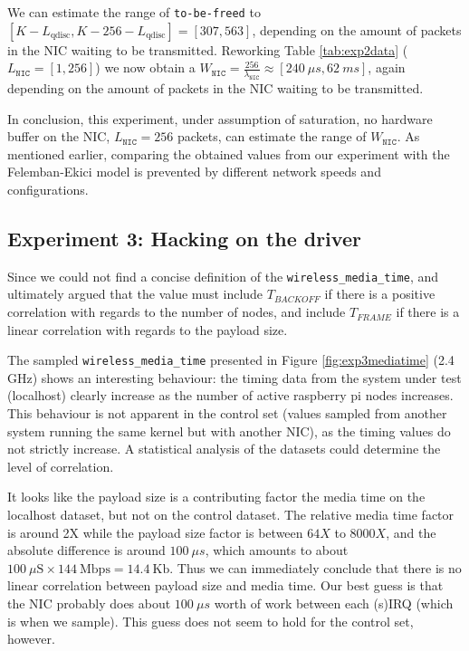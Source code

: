 We can estimate the range of \texttt{to-be-freed} to $[K - L_\text{qdisc}, K -
256 - L_\text{qdisc}] = [307, 563]$, depending on the amount of packets in the
NIC waiting to be transmitted. Reworking Table \ref{tab:exp2data}
($L_\texttt{NIC} = [1, 256]$) we now obtain a $W_\texttt{NIC} =
\frac{256}{\lambda_\texttt{NIC}} \approx [240~\mu s, 62~ms]$, again depending
on the amount of packets in the NIC waiting to be transmitted.

In conclusion, this experiment, under assumption of saturation, no hardware
buffer on the NIC, $L_\texttt{NIC} = 256$ packets, can estimate the range of
$W_\texttt{NIC}$. As mentioned earlier, comparing the obtained
values from our experiment with the Felemban-Ekici model is prevented by
different network speeds and configurations.

\subsection{Experiment 3: Hacking on the driver}

Since we could not find a concise definition of the
\texttt{wireless\_media\_time}, and ultimately argued that the value must include $T_{BACKOFF}$ if there is a positive correlation with regards to the number
of nodes, and include $T_{FRAME}$ if there is a linear correlation with regards to the payload size.

The sampled \texttt{wireless\_media\_time} presented in Figure \ref{fig:exp3mediatime} (2.4 GHz) shows an interesting behaviour: the timing data from the system under test (localhost) clearly increase as the number
of active raspberry pi nodes increases. This behaviour is not apparent in the control set (values sampled from another system running
the same kernel but with another NIC), as the timing values do not strictly
increase. A statistical analysis of the datasets could determine the level of correlation.

It looks like the payload size is a contributing factor the
media time on the localhost dataset, but not on the control dataset. The relative
media time factor is around 2X while the payload size factor is between $64X$ to $8000X$, and the absolute difference is around $100~\mu s$, which amounts to about
$100~\text{$\mu$S} \times 144~\text{Mbps} = 14.4~\text{Kb}$. Thus we can immediately conclude that there is no linear correlation between payload size and
media time. Our best guess is that the NIC probably does about $100~\mu s$ worth
of work between each (s)IRQ (which is when we sample). This guess does not seem
to hold for the control set, however.

